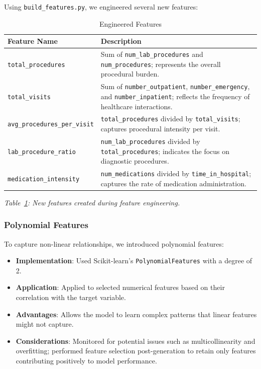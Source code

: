 \documentclass{article}
\begin{document}
Using \texttt{build\_features.py}, we engineered several new features:

\begin{table}[H]
\centering
\caption{Engineered Features}\label{tab:engineered_features}
\begin{tabular}{p{4cm} p{10cm}}
\toprule
\textbf{Feature Name} & \textbf{Description} \\
\midrule
\texttt{total\_procedures} & Sum of \texttt{num\_lab\_procedures} and \texttt{num\_procedures}; represents the overall procedural burden. \\
\texttt{total\_visits} & Sum of \texttt{number\_outpatient}, \texttt{number\_emergency}, and \texttt{number\_inpatient}; reflects the frequency of healthcare interactions. \\
\texttt{avg\_procedures\_per\_visit} & \texttt{total\_procedures} divided by \texttt{total\_visits}; captures procedural intensity per visit. \\
\texttt{lab\_procedure\_ratio} & \texttt{num\_lab\_procedures} divided by \texttt{total\_procedures}; indicates the focus on diagnostic procedures. \\
\texttt{medication\_intensity} & \texttt{num\_medications} divided by \texttt{time\_in\_hospital}; captures the rate of medication administration. \\
\bottomrule
\end{tabular}
\end{table}

\textit{Table~\ref{tab:engineered_features}: New features created during feature engineering.}

\subsubsection{Polynomial Features}

To capture non-linear relationships, we introduced polynomial features:

\begin{itemize}[leftmargin=*]
    \item \textbf{Implementation}: Used Scikit-learn's \texttt{PolynomialFeatures} with a degree of 2.
    \item \textbf{Application}: Applied to selected numerical features based on their correlation with the target variable.
    \item \textbf{Advantages}: Allows the model to learn complex patterns that linear features might not capture.
    \item \textbf{Considerations}: Monitored for potential issues such as multicollinearity and overfitting; performed feature selection post-generation to retain only features contributing positively to model performance.
\end{itemize}
\end{document}
